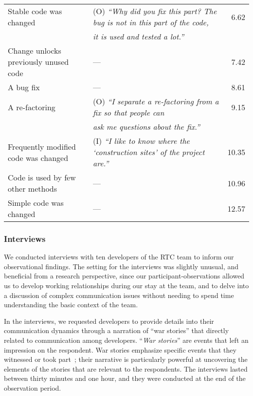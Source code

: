 \begin{sidewaystable}
\begin{tabular}{l@{\hspace{-10pt}}l@{\hspace{-20pt}}r}
Stable code was changed &(O) {\small\emph{``Why did you fix this part? The bug is not in this part of the code, }}& 6.62\\%
&\emph{it is used and tested a lot.''}&\\
Change unlocks previously unused code &--- & 7.42\\%
A bug fix &--- & 8.61\\%
A re-factoring &(O) \emph{``I separate a re-factoring from a fix so that people can }& 9.15\\%
&\emph{ask me questions about the fix.''}&\\
Frequently modified code was changed &(I) \emph{``I like to know where the `construction sites' of the project are.''}& 10.35\\%
Code is used by few other methods &--- & 10.96\\%
Simple code was changed\phantom{abcdefgheabcdefghe} &--- & 12.57\\%
\bottomrule
\end{tabular}
\label{tab:sub-technical}
\label{tab:surveyfactors}
\end{sidewaystable}

\subsubsection{Interviews}
We conducted interviews with ten developers of the RTC team to inform our observational findings. The setting for the interviews was slightly unusual, and beneficial from a research perspective, since our participant-observations allowed us to develop working relationships during our stay at the team, and to delve into a discussion of complex communication issues without needing to spend time understanding the basic context of the team.

In the interviews, we requested developers to provide details into their communication dynamics through a narration of ``war stories'' that directly related to communication among developers. ``\emph{War stories}'' are events that left an impression on the respondent. War stories emphasize specific events that they witnessed or took part~\cite{lutters:ist:2007}; their narrative is particularly powerful at uncovering the elements of the stories that are relevant to the respondents. The interviews lasted between thirty minutes and one hour, and they were conducted at the end of the observation period. 



